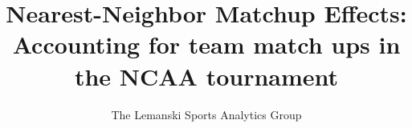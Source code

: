\documentclass[letterpaper,12pt]{article}
\title{Nearest-Neighbor Matchup Effects:  Accounting for team match ups in the NCAA tournament}
\author{The Lemanski Sports Analytics Group}
\begin{document}


\originalmaketitle





%

%


%









\end{document}

